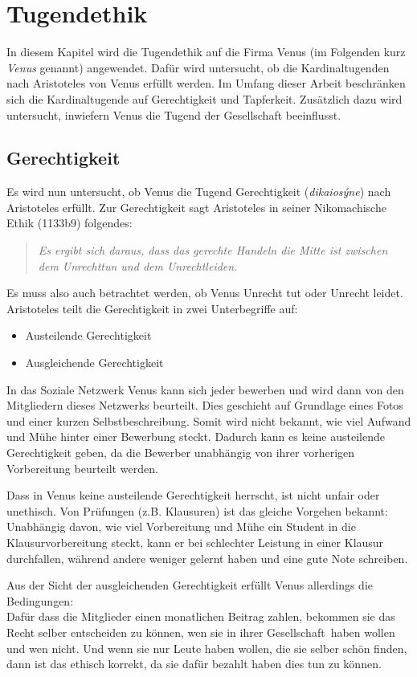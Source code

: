 \author{Autor: An-Nam Pham}
\section{Tugendethik}
In diesem Kapitel wird die Tugendethik auf die Firma Venus (im Folgenden kurz \textit{Venus} genannt) angewendet. Dafür wird untersucht, ob die Kardinaltugenden nach Aristoteles von Venus erfüllt werden. Im Umfang dieser Arbeit beschränken sich die Kardinaltugende auf Gerechtigkeit und Tapferkeit. Zusätzlich dazu wird untersucht, inwiefern Venus die Tugend der Gesellschaft beeinflusst.
\subsection{Gerechtigkeit}
Es wird nun untersucht, ob Venus die Tugend Gerechtigkeit (\textit{dikaiosýne}) nach Aristoteles erfüllt. Zur Gerechtigkeit sagt Aristoteles in seiner Nikomachische Ethik (1133b9) folgendes:
\begin{quote}
\textit{\glqq Es ergibt sich daraus, dass das gerechte Handeln die Mitte ist zwischen dem Unrechttun und dem Unrechtleiden.\grqq} 
\end{quote}
Es muss also auch betrachtet werden, ob Venus Unrecht tut oder Unrecht leidet.\\
Aristoteles teilt die Gerechtigkeit in zwei Unterbegriffe auf:
\begin{itemize}
\item Austeilende Gerechtigkeit
\item Ausgleichende Gerechtigkeit
\end{itemize}
In das Soziale Netzwerk Venus kann sich jeder bewerben und wird dann von den Mitgliedern dieses Netzwerks beurteilt. Dies geschieht auf Grundlage eines Fotos und einer kurzen Selbstbeschreibung. Somit wird nicht bekannt, wie viel Aufwand und Mühe hinter einer Bewerbung steckt. Dadurch kann es keine austeilende Gerechtigkeit geben, da die Bewerber unabhängig von ihrer vorherigen Vorbereitung beurteilt werden.

Dass in Venus keine austeilende Gerechtigkeit herrscht, ist nicht unfair oder unethisch. Von Prüfungen (z.B. Klausuren) ist das gleiche Vorgehen bekannt: Unabhängig davon, wie viel Vorbereitung und Mühe ein Student in die Klausurvorbereitung steckt, kann er bei schlechter Leistung in einer Klausur durchfallen, während andere weniger gelernt haben und eine gute Note schreiben.

Aus der Sicht der ausgleichenden Gerechtigkeit erfüllt Venus allerdings die Bedingungen:\\
Dafür dass die Mitglieder einen monatlichen Beitrag zahlen, bekommen sie das Recht selber entscheiden zu können, wen sie in ihrer \glqq Gesellschaft\grqq~haben wollen und wen nicht. Und wenn sie nur Leute haben wollen, die sie selber schön finden, dann ist das ethisch korrekt, da sie dafür bezahlt haben dies tun zu können.

